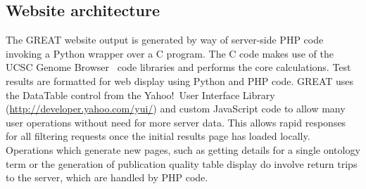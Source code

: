 \subsection*{Website architecture}
\label{XArchitecture}
The GREAT website output is generated by way of server-side PHP code invoking
a Python wrapper over a C program.  The C code makes use of the UCSC Genome
Browser~\citep{Kent2002b} code libraries and performs the core calculations.
Test results are formatted for web display using Python and PHP code.  GREAT
uses the DataTable control from the Yahoo!\ User Interface Library
(\url{http://developer.yahoo.com/yui/}) and custom JavaScript code to allow
many user operations without need for more server data.  This allows
rapid responses for all filtering requests once the initial results
page has loaded locally.  Operations which generate new pages, such as
getting details for a single ontology term or the generation of publication
quality table display do involve return trips to the server, which are
handled by PHP code.

